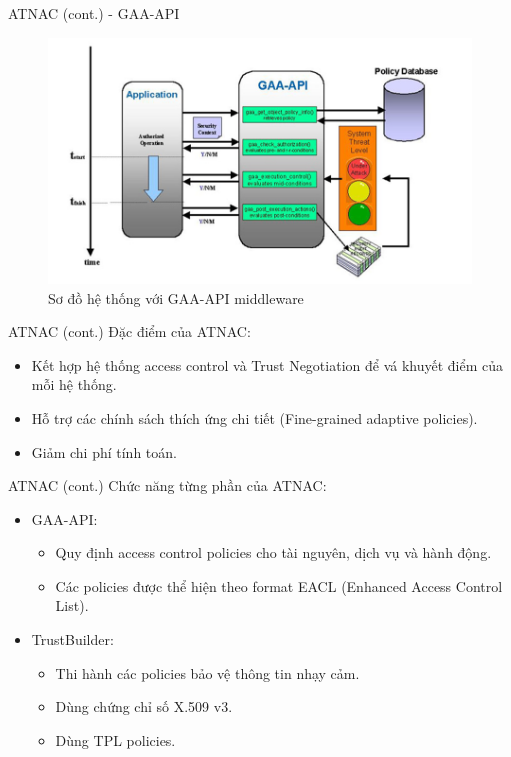 \documentclass[11pt]{beamer}
\begin{document}
\begin{frame}{ATNAC (cont.) - GAA-API}
\begin{figure}
\centering
\includegraphics[scale=.5]{img/gaa-api.png}
\caption{Sơ đồ hệ thống với GAA-API middleware}
\label{fig:gaa_api}
\end{figure}
\end{frame}

\begin{frame}{ATNAC (cont.)}
Đặc điểm của ATNAC:
\begin{itemize}
\item Kết hợp hệ thống access control và Trust Negotiation để vá  khuyết điểm của mỗi hệ thống.
\item Hỗ trợ các chính sách thích ứng chi tiết (Fine-grained adaptive policies).
\item Giảm chi phí tính toán.
\end{itemize}
\end{frame}

\begin{frame}{ATNAC (cont.)}
Chức năng từng phần của ATNAC:
\begin{itemize}
\item GAA-API:
\begin{itemize}
\item Quy định access control policies cho tài nguyên, dịch vụ và hành động.
\item Các policies được thể hiện theo format EACL (Enhanced Access Control List).
\end{itemize}
\item TrustBuilder:
\begin{itemize}
\item Thi hành các policies bảo vệ thông tin nhạy cảm.
\item Dùng chứng chỉ số X.509 v3.
\item Dùng TPL policies.
\end{itemize}
\end{itemize}
\end{frame}
\end{document}
